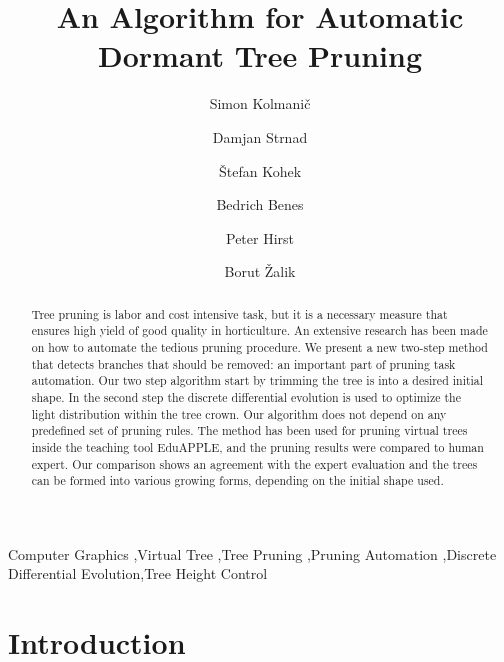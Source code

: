 \documentclass[1p]{elsarticle}
\date{}
\begin{document}
\begin{frontmatter}


\title{An Algorithm for Automatic Dormant Tree Pruning }

\author[FERI]{Simon Kolmanič}
\author[FERI]{Damjan Strnad}
\author[FERI]{Štefan Kohek}
\author[PURDUE]{Bedrich Benes}
\author[PURDUE]{Peter Hirst}
\author[FERI]{Borut Žalik}

\address[FERI]{Faculty of Electrical Engineering and Computer Science, University of Maribor, Koroška cesta 46, 2000 Maribor, Slovenia}
\address[PURDUE]{Purdue University West Lafayette, IN 47906, USA}



\begin{abstract}


Tree pruning is labor and cost intensive task, but it is a necessary
measure that ensures high yield of good quality in horticulture. An
extensive research has been made on how to automate the tedious pruning
procedure. We present a new two-step method that detects branches that
should be removed: an important part of pruning task automation. Our two
step algorithm start by trimming the tree is into a desired initial
shape. In the second step the discrete differential evolution is used to
optimize the light distribution within the tree crown. Our algorithm
does not depend on any predefined set of pruning rules. The method has
been used for pruning virtual trees inside the teaching tool EduAPPLE,
and the pruning results were compared to human expert. Our comparison
shows an agreement with the expert evaluation and the trees can be
formed into various growing forms, depending on the initial shape used.



\end{abstract} 

\begin{keyword}
Computer Graphics \sep Virtual Tree  \sep Tree Pruning \sep Pruning Automation \sep Discrete Differential Evolution\sep Tree Height Control
\end{keyword}

\end{frontmatter}





\section{Introduction}
\end{document}
